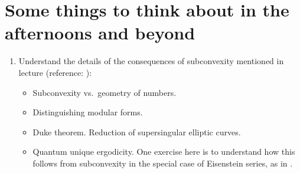 \documentclass[reqno]{amsart} 
\begin{document}
\section{Some things to think about in the afternoons and beyond}

\begin{enumerate}
\item Understand the details of the consequences of subconvexity mentioned in lecture (reference: \cite[\S5]{MR2331346}):
  \begin{itemize}
  \item Subconvexity vs.\ geometry of numbers.
  \item Distinguishing modular forms.
  \item Duke theorem.  Reduction of supersingular elliptic curves.
  \item Quantum unique ergodicity.  One exercise here is to understand how this follows from subconvexity in the special case of Eisenstein series, as in \cite[\S2]{MR1361757}.
  \end{itemize}


\end{enumerate}
\end{document}
